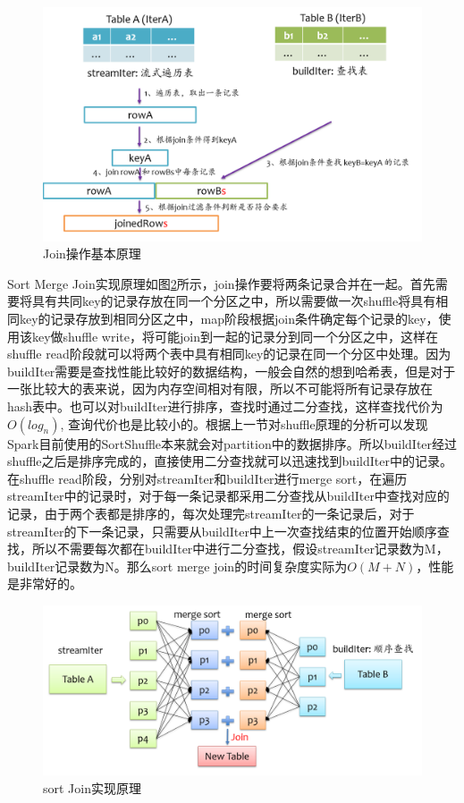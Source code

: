 \begin{figure}
    \centering
    \includegraphics[width=1\textwidth]{Img/spark-sql-join-basic.png}
    \caption{Join操作基本原理}
    \label{fig:join-basic}
\end{figure}

Sort Merge Join实现原理如图\ref{fig:sort-join}所示，join操作要将两条记录合并在一起。首先需要将具有共同key的记录存放在同一个分区之中，所以需要做一次shuffle将具有相同key的记录存放到相同分区之中，map阶段根据join条件确定每个记录的key，使用该key做shuffle write，将可能join到一起的记录分到同一个分区之中，这样在shuffle read阶段就可以将两个表中具有相同key的记录在同一个分区中处理。因为buildIter需要是查找性能比较好的数据结构，一般会自然的想到哈希表，但是对于一张比较大的表来说，因为内存空间相对有限，所以不可能将所有记录存放在hash表中。也可以对buildIter进行排序，查找时通过二分查找，这样查找代价为$O(log_n)$, 查询代价也是比较小的。根据上一节对shuffle原理的分析可以发现Spark目前使用的SortShuffle本来就会对partition中的数据排序。所以buildIter经过shuffle之后是排序完成的，直接使用二分查找就可以迅速找到buildIter中的记录。在shuffle read阶段，分别对streamIter和buildIter进行merge sort，在遍历streamIter中的记录时，对于每一条记录都采用二分查找从buildIter中查找对应的记录，由于两个表都是排序的，每次处理完streamIter的一条记录后，对于streamIter的下一条记录，只需要从buildIter中上一次查找结束的位置开始顺序查找，所以不需要每次都在buildIter中进行二分查找，假设streamIter记录数为M，buildIter记录数为N。那么sort merge join的时间复杂度实际为$O(M+N)$，性能是非常好的。

\begin{figure}
    \centering
    \includegraphics[width=1\textwidth]{Img/spark-sql-sort-join.png}
    \caption{sort Join实现原理}
    \label{fig:sort-join}
\end{figure}

